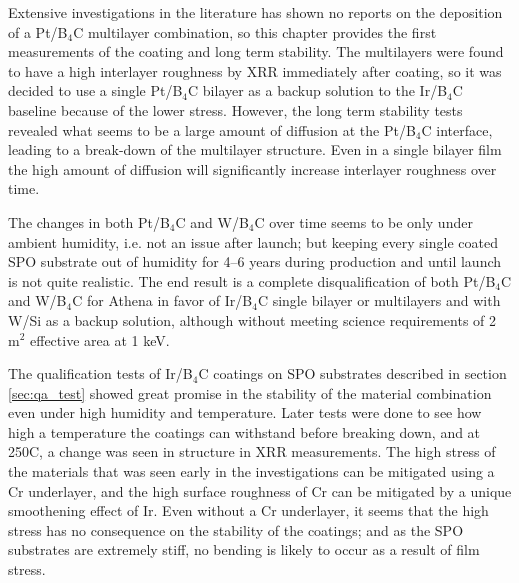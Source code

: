 Extensive investigations in the literature has shown no reports on the deposition of a Pt/B$_4$C multilayer combination, so this chapter provides the first measurements of the coating and long term stability. The multilayers were found to have a high interlayer roughness by XRR immediately after coating, so it was decided to use a single Pt/B$_4$C bilayer as a backup solution to the Ir/B$_4$C baseline because of the lower stress. However, the long term stability tests revealed what seems to be a large amount of diffusion at the Pt/B$_4$C interface, leading to a break-down of the multilayer structure. Even in a single bilayer film the high amount of diffusion will significantly increase interlayer roughness over time.

The changes in both Pt/B$_4$C and W/B$_4$C over time seems to be only under ambient humidity, i.e. not an issue after launch; but keeping every single coated SPO substrate out of humidity for 4--6 years during production and until launch is not quite realistic. The end result is a complete disqualification of both Pt/B$_4$C and W/B$_4$C for Athena in favor of Ir/B$_4$C single bilayer or multilayers and with W/Si as a backup solution, although without meeting science requirements of 2 m$^2$ effective area at 1 keV.

The qualification tests of Ir/B$_4$C coatings on SPO substrates described in section \ref{sec:qa_test} showed great promise in the stability of the material combination even under high humidity and temperature. Later tests were done to see how high a temperature the coatings can withstand before breaking down, and at 250\degr C, a change was seen in structure in XRR measurements. The high stress of the materials that was seen early in the investigations can be mitigated using a Cr underlayer, and the high surface roughness of Cr can be mitigated by a unique smoothening effect of Ir. Even without a Cr underlayer, it seems that the high stress has no consequence on the stability of the coatings; and as the SPO substrates are extremely stiff, no bending is likely to occur as a result of film stress.

